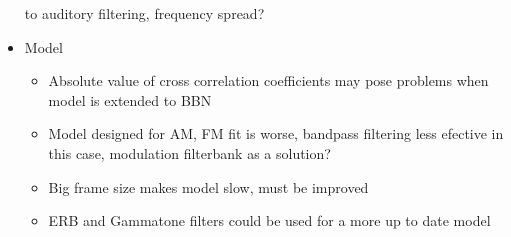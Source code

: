 \documentclass[../main.tex]{subfiles}
\begin{document}
\begin{itemize}
      to auditory filtering, frequency spread?
  \item Model
  \begin{itemize}
    \item Absolute value of cross correlation coefficients may pose problems
      when model is extended to BBN
    \item Model designed for AM, FM fit is worse, bandpass filtering less
      efective in this case, modulation filterbank as a solution?
    \item Big frame size makes model slow, must be improved
    \item ERB and Gammatone filters could be used for a more up to date model
  \end{itemize}

\end{itemize}
\end{document}
